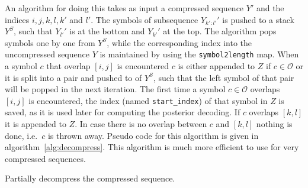 An algorithm for doing this takes as input a compressed sequence $Y'$ and the
indices $i, j, k, l, k'$ and $l'$. The symbols of subsequence $Y_{k':l'}'$ is
pushed to a stack $Y^S$, such that $Y_{l'}'$ is at the bottom and $Y_{k'}'$ at
the top. The algorithm pops symbols one by one from $Y^S$, while the
corresponding index into the uncompressed sequence $Y$ is maintained by using
the \texttt{symbol2length} map. When a symbol $c$ that overlap $[i, j]$ is
encountered $c$ is either appended to $Z$ if $c \in \mathcal{O}$ or it is split
into a pair and pushed to of $Y^S$, such that the left symbol of that pair will
be popped in the next iteration. The first time a symbol $c \in \mathcal{O}$
overlaps $[i, j]$ is encountered, the index (named \texttt{start\_index}) of
that symbol in $Z$ is saved, as it is used later for computing the posterior
decoding. If $c$ overlaps $[k, l]$ it is appended to $Z$. In case there is no
overlap between $c$ and $[k, l]$ nothing is done, i.e.\ $c$ is thrown away.
Pseudo code for this algorithm is given in algorithm~\ref{alg:decompress}. This
algorithm is much more efficient to use for very compressed sequences.

\begin{algorithm}
  \caption{Partially decompress the compressed sequence.}
  \label{alg:decompress}
  \begin{algorithmic}[1]
                 
                    \EndIf{}
                \Else{}
                     
                \EndIf{}
                 
            \EndIf{}
             
        \EndWhile{}
    \EndProcedure{}
  \end{algorithmic}
\end{algorithm}

